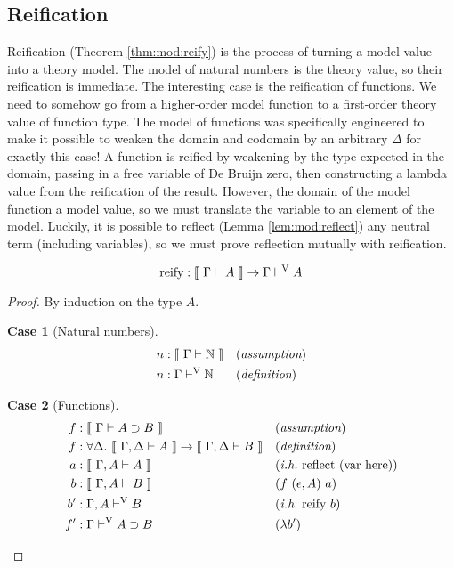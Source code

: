 \documentclass{llncs}
\newtheorem{scase}{Case}
\newcommand{\refthm}[1]{Theorem \ref{thm:#1}}
\newcommand{\reflem}[1]{Lemma \ref{lem:#1}}
\def\arr{\supset}
\def\marr{\rightarrow}
\def\lam{\lambda}
\def\nat{\mathbb{N}}
\def\emp{\epsilon}
\def\bydef{(\textit{definition})}
\def\byass{(\textit{assumption})}
\newcommand{\ih}[1]{(\textit{i.h.}~ #1)}
\newcommand{\by}[1]{(#1)}
\newcommand{\turn}[1]{\vdash^\con{#1}}
\newcommand{\all}[1]{\forall#1.~}
\newcommand{\el}[1]{\llbracket ~ #1 ~ \rrbracket}
\newcommand{\con}[1]{\textmd{#1}}
\newcommand{\fun}[1]{\textmd{#1}}
\newcommand{\typm}[1]{\el{\Gamma \vdash #1}}
\newcommand{\gdtypm}[1]{\el{\Gamma, \Delta \vdash #1}}
\newcommand{\gatypm}[1]{\el{\Gamma, A \vdash #1}}
\newcommand{\typv}[1]{\Gamma \turn{V} #1}
\newcommand{\gatypv}[1]{\Gamma, A \turn{V} #1}
\begin{document}
\subsection{Reification}

Reification (\refthm{mod:reify}) is the process of turning a model value into a theory
model. The model of natural numbers is the theory value, so their
reification is immediate. The interesting case is the reification of
functions. We need to somehow go from a higher-order model function to
a first-order theory value of function type. The model of functions
was specifically engineered to make it possible to weaken the domain
and codomain by an arbitrary $\Delta$ for exactly this case! A
function is reified by weakening by the type expected in the domain,
passing in a free variable of De Bruijn zero, then constructing a
lambda value from the reification of the result. However, the domain
of the model function a model value, so we must translate the variable
to an element of the model. Luckily, it is possible to
reflect (\reflem{mod:reflect}) any neutral term (including variables),
so we must prove reflection mutually with reification.

\begin{theorem}
\label{thm:mod:reify}
$$
\fun{reify} : \typm{A} \marr \typv{A}
$$

\begin{proof}

By induction on the type $A$.

\begin{scase}[Natural numbers]
\begin{align*}
n  &: \typm{\nat} && \byass\\
n  &: \typv{\nat} && \bydef
\end{align*}
\end{scase}

\begin{scase}[Functions]
\begin{align*}
f &: \typm{A \arr B} && \byass\\
f &: \all{\Delta} \gdtypm{A} \marr \gdtypm{B} && \bydef\\
a &: \gatypm{A} && \ih{\fun{reflect}~(\con{var here})}\\
b &: \gatypm{B} && \by{f~(\emp, A)~a}\\
b' &: \gatypv{B} && \ih{\fun{reify}~b}\\
f' &: \typv{A \arr B} && \by{\lam b'}
\end{align*}
\end{scase}

\end{proof}

\end{theorem}
\end{document}
